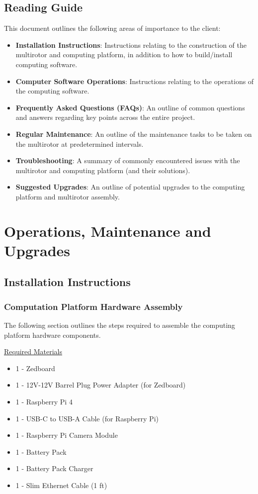 \documentclass[10pt,letterpaper]{article}
\begin{document}
\subsection{Reading Guide}
This document outlines the following areas of importance to the client: 
\begin{itemize}
\item \textbf{Installation Instructions}: Instructions relating to the construction of the multirotor and computing platform, in addition to how to build/install computing software.
\item \textbf{Computer Software Operations}: Instructions relating to the operations of the computing software.
\item \textbf{Frequently Asked Questions (FAQs)}: An outline of common questions and answers regarding key points across the entire project.
\item \textbf{Regular Maintenance}: An outline of the maintenance tasks to be taken on the multirotor at predetermined intervals.
\item \textbf{Troubleshooting}: A summary of commonly encountered issues with the multirotor and computing platform (and their solutions).
\item \textbf{Suggested Upgrades}: An outline of potential upgrades to the computing platform and multirotor assembly.
\end{itemize}


\section{Operations, Maintenance and Upgrades}
\subsection{Installation Instructions}
\subsubsection{Computation Platform Hardware Assembly}
The following section outlines the steps required to assemble the computing platform hardware components.

\underline{Required Materials}
\begin{itemize}
\item 1 - Zedboard
\item 1 - 12V-12V Barrel Plug Power Adapter (for Zedboard)
\item 1 - Raspberry Pi 4
\item 1 - USB-C to USB-A Cable (for Raspberry Pi)
\item 1 - Raspberry Pi Camera Module
\item 1 - Battery Pack
\item 1 - Battery Pack Charger
\item 1 - Slim Ethernet Cable (1 ft)
\end{itemize}
\end{document}
